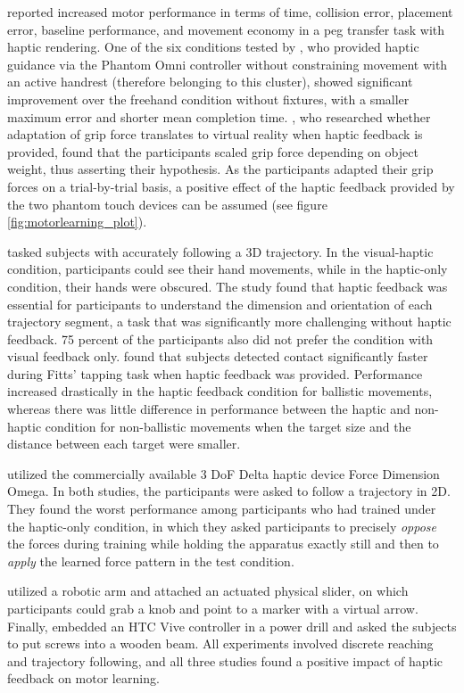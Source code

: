 \cite{Brickler2019} reported increased motor performance in terms of time, collision error, placement error, baseline performance, and movement economy in a peg transfer task with haptic rendering. One of the six conditions tested by \cite{Fehlberg2012}, who provided haptic guidance via the Phantom Omni controller without constraining movement with an active handrest (therefore belonging to this cluster), showed significant improvement over the freehand condition without fixtures, with a smaller maximum error and shorter mean completion time. \cite{Gunter2022}, who researched whether adaptation of grip force translates to virtual reality when haptic feedback is provided, found that the participants scaled grip force depending on object weight, thus asserting their hypothesis. As the participants adapted their grip forces on a trial-by-trial basis, a positive effect of the haptic feedback provided by the two phantom touch devices can be assumed (see figure \ref{fig:motorlearning_plot}). 

\cite{Rodriguez2010} tasked subjects with accurately following a 3D trajectory. In the visual-haptic condition, participants could see their hand movements, while in the haptic-only condition, their hands were obscured. The study found that haptic feedback was essential for participants to understand the dimension and orientation of each trajectory segment, a task that was significantly more challenging without haptic feedback. 75 percent of the participants also did not prefer the condition with visual feedback only. 
\cite{Wall2000} found that subjects detected contact significantly faster during Fitts' tapping task when haptic feedback was provided. Performance increased drastically in the haptic feedback condition for ballistic movements, whereas there was little difference in performance between the haptic and non-haptic condition for non-ballistic movements when the target size and the distance between each target were smaller.

\cite{Morris2007} utilized the commercially available 3 DoF Delta haptic device Force Dimension Omega. In both studies, the participants were asked to follow a trajectory in 2D. They found the worst performance among participants who had trained under the haptic-only condition, in which they asked participants to precisely \textit{oppose} the forces during training while holding the apparatus exactly still and then to \textit{apply} the learned force pattern in the test condition. 

\cite{Dai2023} utilized a robotic arm and attached an actuated physical slider, on which participants could grab a knob and point to a marker with a virtual arrow. Finally, \cite{Yang2023} embedded an HTC Vive controller in a power drill and asked the subjects to put screws into a wooden beam. All experiments involved discrete reaching and trajectory following, and all three studies found a positive impact of haptic feedback on motor learning. 

